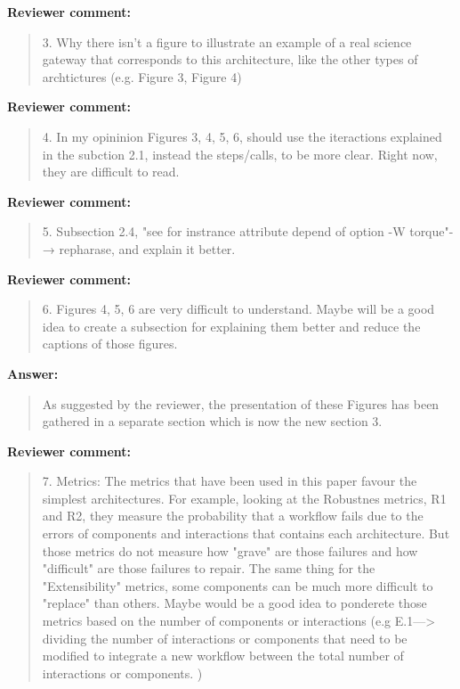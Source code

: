 \documentclass[a4]{article}
\newenvironment{review}%
{\textbf{Reviewer comment:}\begin{quote}}%
{\end{quote}}%
\newenvironment{answer}%
{\textbf{Answer:}\begin{small}\begin{quote}}%
{\end{quote}\end{small}}%
\begin{document}
\begin{review}
  3. Why there isn't a figure to illustrate an example of a real
  science gateway that corresponds to this architecture, like the
  other types of archtictures (e.g. Figure 3, Figure 4)
\end{review}

\begin{review}
  4. In my opininion Figures 3, 4, 5, 6, should use the iteractions
  explained in the subction 2.1, instead the steps/calls, to be more
  clear. Right now, they are difficult to read.
\end{review}

\begin{review}
  5.  Subsection 2.4, "see for instrance attribute depend of option -W
  torque"-→ repharase, and explain it better.
\end{review}

\begin{review}
6.  Figures 4, 5, 6 are very difficult to understand. Maybe will be a
good idea to create a subsection for explaining them better and reduce
the captions of those figures.
\end{review}

\begin{answer}
  As suggested by the reviewer, the presentation of these Figures has
  been gathered in a separate section which is now the new section 3.
\end{answer}

\begin{review}
  7.  Metrics: The metrics that have been used in this paper favour
  the simplest architectures. For example, looking at the Robustnes
  metrics, R1 and R2, they measure the probability that a workflow
  fails due to the errors of components and interactions that contains
  each architecture. But those metrics do not measure how "grave" are
  those failures and how "difficult" are those failures to repair. The
  same thing for the "Extensibility" metrics, some components can be
  much more difficult to "replace" than others.  Maybe would be a good
  idea to ponderete those metrics based on the number of components or
  interactions (e.g E.1---> dividing the number of interactions or
  components that need to be modified to integrate a new workflow
  between the total number of interactions or components. )
\end{review}
\end{document}
